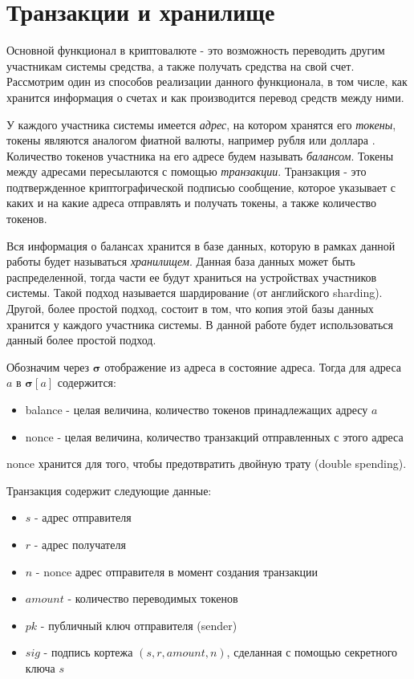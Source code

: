 \section{Транзакции и хранилище} \label{sec:tx}
Основной функционал в криптовалюте - это возможность переводить другим участникам системы средства, а также получать средства на свой счет.
Рассмотрим один из способов реализации данного функционала,
в том числе, как хранится информация о счетах и как производится перевод средств между ними.

У каждого участника системы имеется \textit{адрес}, на котором хранятся его \textit{токены}, токены
являются аналогом фиатной валюты, например рубля или доллара . Количество токенов участника на его адресе будем называть \textit{балансом}. Токены между адресами пересылаются с помощью \textit{транзакции}. Транзакция - это подтвержденное криптографической подписью сообщение, которое указывает с каких и на какие адреса отправлять и получать токены, а также количество токенов.

Вся информация о балансах хранится в базе данных, которую в рамках данной работы будет называться \textit{хранилищем}.
Данная база данных может быть распределенной, тогда части ее будут храниться на устройствах участников системы. 
Такой подход называется шардирование (от английского sharding). 
Другой, более простой подход, состоит в том, что копия этой базы данных хранится у каждого участника системы.
В данной работе будет использоваться данный более простой подход.

Обозначим через $\boldsymbol{\sigma}$ отображение из адреса в состояние адреса. Тогда для адреса $a$ в $\boldsymbol{\sigma}[a]$ содержится:
\begin{itemize}
\item balance - целая величина, количество токенов принадлежащих адресу $a$
\item nonce  - целая величина, количество транзакций отправленных с этого адреса
\end{itemize}

nonce хранится для того, чтобы предотвратить двойную трату (double spending)\cite{double-spending}.

\noindent Транзакция содержит следующие данные:
\begin{itemize}
\item $s$ - адрес отправителя
\item $r$ - адрес получателя
\item $n$ - nonce адрес отправителя в момент создания транзакции
\item $amount$ - количество переводимых токенов
\item $pk$ - публичный ключ отправителя (sender)
\item $sig$ - подпись кортежа $(s, r, amount, n)$, сделанная с помощью секретного ключа $s$
\end{itemize}

